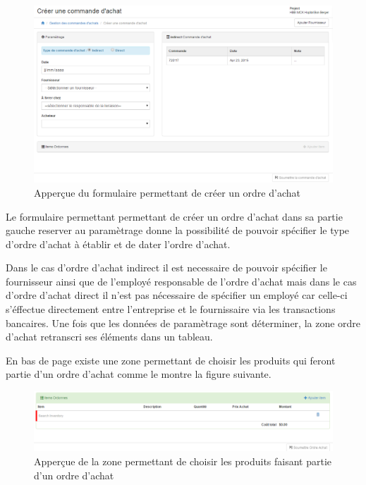 \documentclass[12pt,a4paper]{report}
\begin{document}
\begin{figure}[h]
\begin{center}
\includegraphics[width=12cm]{pic/OrdreAchatForm.png}
\end{center}
\caption{Apperçue du formulaire permettant de créer un ordre d'achat}
\label{Apperçue du formulaire permettant de créer un ordre d'achat}
\end{figure}

Le formulaire permettant permettant de créer un ordre d'achat dans sa partie gauche reserver au paramètrage donne la possibilité de pouvoir spécifier le type d'ordre d'achat à établir et de dater l'ordre d'achat.

Dans le cas d'ordre d'achat indirect il est necessaire de pouvoir spécifier le fournisseur ainsi que de l'employé responsable de l'ordre d'achat mais dans le cas d'ordre d'achat direct il n'est pas nécessaire de spécifier un employé car celle-ci s'éffectue directement entre l'entreprise et le fournissaire via les transactions bancaires. Une fois que les données de paramètrage sont déterminer, la zone ordre d'achat retranscri ses éléments dans un tableau.

En bas de page existe une zone permettant de choisir les produits qui feront partie d'un ordre d'achat comme le montre la figure suivante.

\begin{figure}[h]
\begin{center}
\includegraphics[width=12cm]{pic/ItemsOrdonnees.png}
\end{center}
\caption{Apperçue de la zone permettant de choisir les produits faisant partie d'un ordre d'achat}
\label{Apperçue de la zone permettant de choisir les produits faisant partie d'un ordre d'achat}
\end{figure} 
\end{document}
